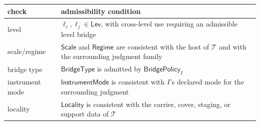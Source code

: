 \documentclass[11pt]{article}
\theoremstyle{definition}
\begin{document}
\begin{longtable}[]{@{}ll@{}}
\toprule
\begin{minipage}[b]{0.47\columnwidth}\raggedright
check\strut
\end{minipage} & \begin{minipage}[b]{0.47\columnwidth}\raggedright
admissibility condition\strut
\end{minipage}\tabularnewline
\midrule
\endhead
\begin{minipage}[t]{0.47\columnwidth}\raggedright
level\strut
\end{minipage} & \begin{minipage}[t]{0.47\columnwidth}\raggedright
\(\ell_i,\ell_j\in\mathsf{Lev}\), with cross-level use requiring an admissible level bridge\strut
\end{minipage}\tabularnewline
\begin{minipage}[t]{0.47\columnwidth}\raggedright
scale/regime\strut
\end{minipage} & \begin{minipage}[t]{0.47\columnwidth}\raggedright
\(\mathsf{Scale}\) and \(\mathsf{Regime}\) are consistent with the host of \(\mathcal T\) and with the surrounding judgment family\strut
\end{minipage}\tabularnewline
\begin{minipage}[t]{0.47\columnwidth}\raggedright
bridge type\strut
\end{minipage} & \begin{minipage}[t]{0.47\columnwidth}\raggedright
\(\mathsf{BridgeType}\) is admitted by \(\mathsf{BridgePolicy}_I\)\strut
\end{minipage}\tabularnewline
\begin{minipage}[t]{0.47\columnwidth}\raggedright
instrument mode\strut
\end{minipage} & \begin{minipage}[t]{0.47\columnwidth}\raggedright
\(\mathsf{InstrumentMode}\) is consistent with \(I\)'s declared mode for the surrounding judgment\strut
\end{minipage}\tabularnewline
\begin{minipage}[t]{0.47\columnwidth}\raggedright
locality\strut
\end{minipage} & \begin{minipage}[t]{0.47\columnwidth}\raggedright
\(\mathsf{Locality}\) is consistent with the carrier, cover, staging, or support data of \(\mathcal T\)\strut
\end{minipage}\tabularnewline
\bottomrule
\end{longtable}
\end{document}
